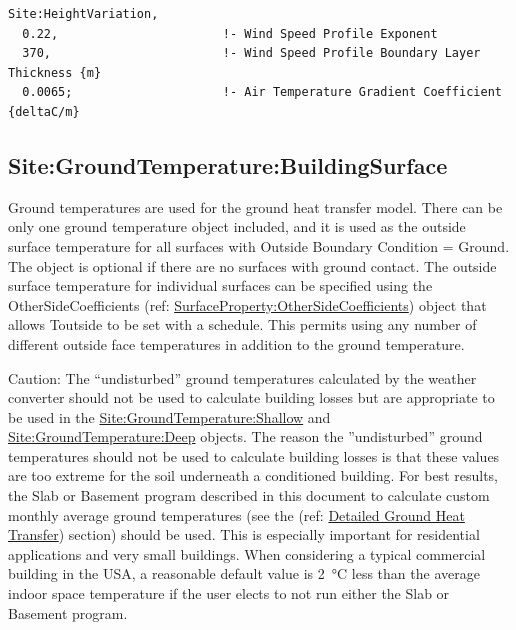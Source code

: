 \begin{lstlisting}
Site:HeightVariation,
  0.22,                       !- Wind Speed Profile Exponent
  370,                        !- Wind Speed Profile Boundary Layer Thickness {m}
  0.0065;                     !- Air Temperature Gradient Coefficient {deltaC/m}
\end{lstlisting}

\subsection{Site:GroundTemperature:BuildingSurface}\label{sitegroundtemperaturebuildingsurface}

Ground temperatures are used for the ground heat transfer model. There can be only one ground temperature object included, and it is used as the outside surface temperature for all surfaces with Outside Boundary Condition = Ground. The object is optional if there are no surfaces with ground contact. The outside surface temperature for individual surfaces can be specified using the OtherSideCoefficients (ref: \hyperref[surfacepropertyothersidecoefficients]{SurfaceProperty:OtherSideCoefficients}) object that allows Toutside to be set with a schedule. This permits using any number of different outside face temperatures in addition to the ground temperature.

\begin{callout}
Caution: The ``undisturbed'' ground temperatures calculated by the weather converter should not be used to calculate building losses but are appropriate to be used in the \hyperref[sitegroundtemperatureshallow]{Site:GroundTemperature:Shallow} and \hyperref[sitegroundtemperaturedeep]{Site:GroundTemperature:Deep} objects. The reason the ''undisturbed'' ground temperatures should not be used to calculate building losses is that these values are too extreme for the soil underneath a conditioned building. For best results, the Slab or Basement program described in this document to calculate custom monthly average ground temperatures (see the (ref: \hyperref[group-detailed-ground-heat-transfer] {Detailed Ground Heat Transfer}) section) should be used. This is especially important for residential applications and very small buildings. When considering a typical commercial building in the USA, a reasonable default value is \SI{2}{\degreeCelsius} less than the average indoor space temperature if the user elects to not run either the Slab or Basement program.
\end{callout}

